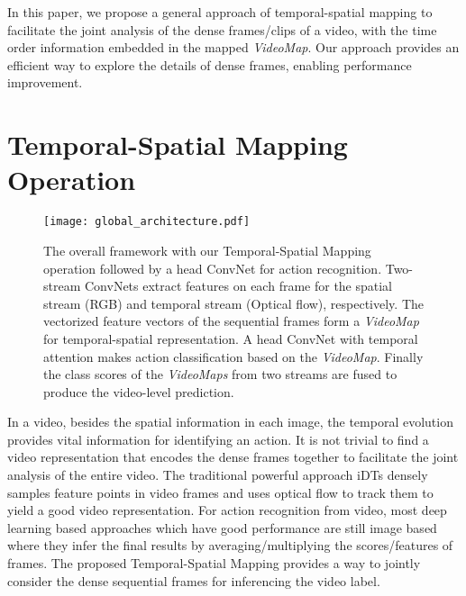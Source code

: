 \documentclass[english, 10pt, twocolumn, twoside]{IEEEtran}
\begin{document}
In this paper, we propose a general approach of temporal-spatial mapping to facilitate the joint analysis of the dense frames/clips of a video, with the time order information embedded in the mapped \emph{VideoMap}. Our approach provides an efficient way to explore the details of dense frames, enabling performance improvement. 




\section{Temporal-Spatial Mapping Operation}
\begin{figure*}[t]
 \centering\texttt{[image: global\_architecture.pdf]}
 \vspace{-5mm}
 \caption{The overall framework with our Temporal-Spatial Mapping operation followed by a head ConvNet for action recognition. Two-stream ConvNets extract features on each frame for the spatial stream (RGB) and temporal stream (Optical flow), respectively. The vectorized feature vectors of the sequential frames form a \emph{VideoMap} for temporal-spatial representation. A head ConvNet with temporal attention makes action classification based on the \emph{VideoMap}. Finally the class scores of the \emph{VideoMaps} from two streams are fused to produce the video-level prediction.}
 \label{fig:arch}
 \vspace{-3mm}
\end{figure*}
In a video, besides the spatial information in each image, the temporal evolution provides vital information for identifying an action. It is not trivial to find a video representation that encodes the dense frames together to facilitate the joint analysis of the entire video. The traditional powerful approach iDTs \cite{wang2013action} densely samples feature points in video frames and uses optical flow to track them to yield a good video representation. For action recognition from video, most deep learning based approaches which have good performance \cite{simonyan2014two,wang2016temporal,diba2017deeptemporal} are still image based where they infer the final results by averaging/multiplying the scores/features of frames. The proposed Temporal-Spatial Mapping provides a way to jointly consider the dense sequential frames for inferencing the video label.
\end{document}

